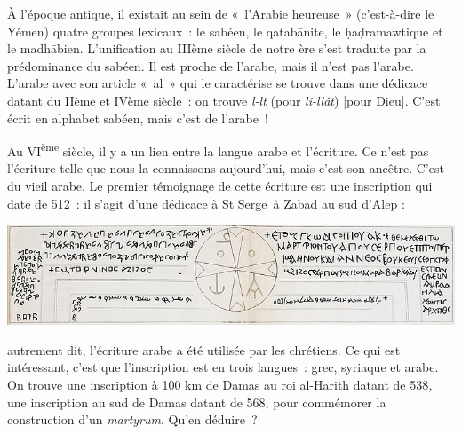 À l'époque antique, il existait au sein de «~l'Arabie heureuse~»
(c'est-à-dire le Yémen) quatre groupes lexicaux~: le sabéen, le
qatabānite, le ḥaḍramawtique et le madhābien. L'unification au IIIème
siècle de notre ère s'est traduite par la prédominance du sabéen. Il est
proche de l'arabe, mais il n'est pas l'arabe. L'arabe avec son article
«~al~» qui le caractérise se trouve dans une dédicace datant du IIème et
IVème siècle~: on trouve \emph{l-lt} (pour \emph{li-llât}) {[}pour
Dieu{]}. C'est écrit en alphabet sabéen, mais c'est de l'arabe~!

Au VI\textsuperscript{ème} siècle, il y a un lien entre la langue arabe
et l'écriture. Ce n'est pas l'écriture telle que nous la connaissons
aujourd'hui, mais c'est son ancêtre. C'est du vieil arabe. Le premier
témoignage de cette écriture est une inscription qui date de 512~: il
s'agit d'une dédicace à St Serge~à Zabad au sud d'Alep :

\includegraphics[width=\textwidth]{Images/image029.jpg}

autrement dit, l'écriture arabe a été utilisée par les chrétiens. Ce qui
est intéressant, c'est que l'inscription est en trois langues~: grec,
syriaque et arabe. On trouve une inscription à 100 km de Damas au roi
al-Harith datant de 538\emph{,} une inscription au sud de Damas datant
de 568, pour commémorer la construction d'un \emph{martyrum}. Qu'en
déduire~?


